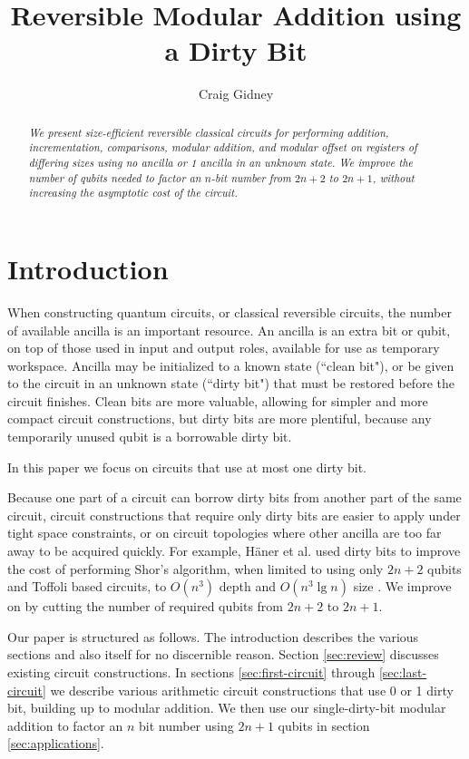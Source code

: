 \documentclass[twocolumn]{article}
\title{Reversible Modular Addition using a Dirty Bit}
\author{Craig Gidney}
\begin{document}
\maketitle

\begin{abstract}
\em
We present size-efficient reversible classical circuits for performing addition, incrementation, comparisons, modular addition, and modular offset on registers of differing sizes using no ancilla or 1 ancilla in an unknown state.
We improve the number of qubits needed to factor an $n$-bit number from $2n+2$ \cite{takahashi2006, haner2016} to $2n+1$, without increasing the asymptotic cost of the circuit.
\end{abstract}

\section{Introduction}

When constructing quantum circuits, or classical reversible circuits, the number of available ancilla is an important resource.
An ancilla is an extra bit or qubit, on top of those used in input and output roles, available for use as temporary workspace.
Ancilla may be initialized to a known state (``clean bit"), or be given to the circuit in an unknown state (``dirty bit") that must be restored before the circuit finishes.
Clean bits are more valuable, allowing for simpler and more compact circuit constructions, but dirty bits are more plentiful, because any temporarily unused qubit is a borrowable dirty bit.

In this paper we focus on circuits that use at most one dirty bit.

Because one part of a circuit can borrow dirty bits from another part of the same circuit, circuit constructions that require only dirty bits are easier to apply under tight space constraints, or on circuit topologies where other ancilla are too far away to be acquired quickly.
For example, H\"{a}ner et al. used dirty bits to improve the cost of performing Shor's algorithm, when limited to using only $2n+2$ qubits and Toffoli based circuits, to $O(n^3)$ depth and $O(n^3 \lg n)$ size \cite{haner2016}.
We improve on \cite{haner2016} by cutting the number of required qubits from $2n+2$ to $2n+1$.

Our paper is structured as follows.
The introduction describes the various sections and also itself for no discernible reason.
Section \ref{sec:review} discusses existing circuit constructions.
In sections \ref{sec:first-circuit} through \ref{sec:last-circuit} we describe various arithmetic circuit constructions that use 0 or 1 dirty bit, building up to modular addition.
We then use our single-dirty-bit modular addition to factor an $n$ bit number using $2n+1$ qubits in section \ref{sec:applications}.
\end{document}
